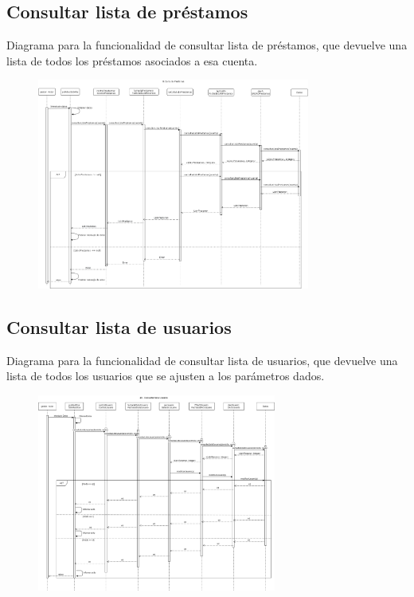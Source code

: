 \documentclass[12pt]{article}
\begin{document}
\subsection{Consultar lista de préstamos}
Diagrama para la funcionalidad de consultar lista de préstamos, que devuelve una lista de todos los préstamos asociados a esa cuenta.
\begin{figure}[H]
    \centering
    \includegraphics[width=0.8\textwidth]{images/19_consultar_prestamos.png}
\end{figure}
\subsection{Consultar lista de usuarios}
Diagrama para la funcionalidad de consultar lista de usuarios, que devuelve una lista de todos los usuarios que se ajusten a los parámetros dados.
\begin{figure}[H]
    \centering
    \includegraphics[width=0.7\textwidth]{images/20-consultarlistausuarios.png}
\end{figure}
\end{document}
